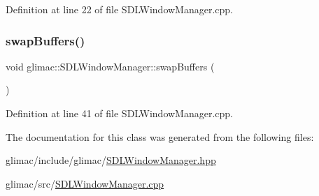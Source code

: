 Definition at line 22 of file S\+D\+L\+Window\+Manager.\+cpp.

\mbox{\label{classglimac_1_1_s_d_l_window_manager_aee6b4f60e5b418a99d35360aea48bd41}} 
\subsubsection{\texorpdfstring{swap\+Buffers()}{swapBuffers()}}
{\footnotesize\ttfamily void glimac\+::\+S\+D\+L\+Window\+Manager\+::swap\+Buffers (\begin{DoxyParamCaption}{ }\end{DoxyParamCaption})}



Definition at line 41 of file S\+D\+L\+Window\+Manager.\+cpp.



The documentation for this class was generated from the following files\+:\begin{DoxyCompactItemize}
\item 
glimac/include/glimac/\hyperlink{_s_d_l_window_manager_8hpp}{S\+D\+L\+Window\+Manager.\+hpp}\item 
glimac/src/\hyperlink{_s_d_l_window_manager_8cpp}{S\+D\+L\+Window\+Manager.\+cpp}\end{DoxyCompactItemize}
